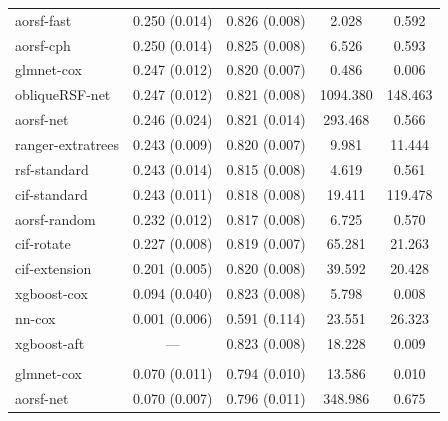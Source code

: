 \documentclass[twoside,11pt]{article}\usepackage[]{graphicx}\usepackage[]{xcolor}
\newenvironment{knitrout}{}{} %
\begin{document}
\begin{knitrout}
\begin{longtable}[t]{lcccc}
\hline
\hspace{1em}aorsf-fast & 0.250 (0.014) & 0.826 (0.008) & 2.028 & 0.592\\
\hspace{1em}aorsf-cph & 0.250 (0.014) & 0.825 (0.008) & 6.526 & 0.593\\
\hspace{1em}glmnet-cox & 0.247 (0.012) & 0.820 (0.007) & 0.486 & 0.006\\
\hspace{1em}obliqueRSF-net & 0.247 (0.012) & 0.821 (0.008) & 1094.380 & 148.463\\
\hspace{1em}aorsf-net & 0.246 (0.024) & 0.821 (0.014) & 293.468 & 0.566\\
\hspace{1em}ranger-extratrees & 0.243 (0.009) & 0.820 (0.007) & 9.981 & 11.444\\
\hspace{1em}rsf-standard & 0.243 (0.014) & 0.815 (0.008) & 4.619 & 0.561\\
\hspace{1em}cif-standard & 0.243 (0.011) & 0.818 (0.008) & 19.411 & 119.478\\
\hspace{1em}aorsf-random & 0.232 (0.012) & 0.817 (0.008) & 6.725 & 0.570\\
\hspace{1em}cif-rotate & 0.227 (0.008) & 0.819 (0.007) & 65.281 & 21.263\\
\hspace{1em}cif-extension & 0.201 (0.005) & 0.820 (0.008) & 39.592 & 20.428\\
\hspace{1em}xgboost-cox & 0.094 (0.040) & 0.823 (0.008) & 5.798 & 0.008\\
\hspace{1em}nn-cox & 0.001 (0.006) & 0.591 (0.114) & 23.551 & 26.323\\
\hspace{1em}xgboost-aft & --- & 0.823 (0.008) & 18.228 & 0.009\\
\addlinespace[0.3em]
\multicolumn{5}{l}{\textit{\textbf{SPRINT; CVD death, n = 9361, p = 174}}}\\
\hline
\hspace{1em}glmnet-cox & 0.070 (0.011) & 0.794 (0.010) & 13.586 & 0.010\\
\hspace{1em}aorsf-net & 0.070 (0.007) & 0.796 (0.011) & 348.986 & 0.675\\

\end{longtable}
\end{knitrout}
\end{document}
